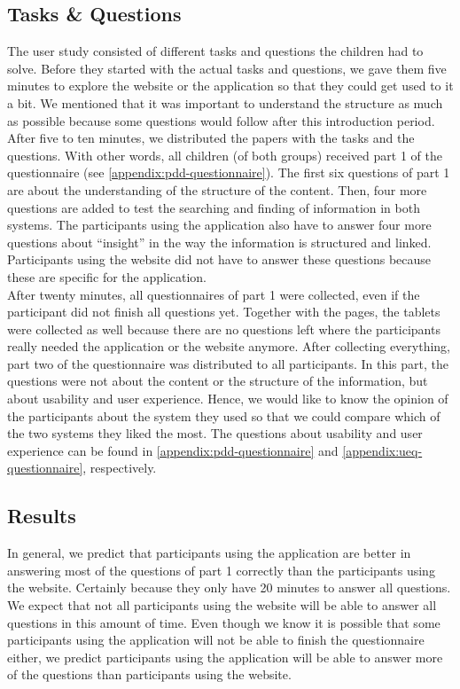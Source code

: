 \subsection{Tasks \& Questions}
The user study consisted of different tasks and questions the children had to solve. Before they started with the actual tasks and questions, we gave them five minutes to explore the website or the application so that they could get used to it a bit. We mentioned that it was important to understand the structure as much as possible because some questions would follow after this introduction period.\\

After five to ten minutes, we distributed the papers with the tasks and the questions. With other words, all children (of both groups) received part 1 of the questionnaire (see \autoref{appendix:pdd-questionnaire}). The first six questions of part 1 are about the understanding of the structure of the content. Then, four more questions are added to test the searching and finding of information in both systems. The participants using the application also have to answer four more questions about ``insight'' in the way the information is structured and linked. Participants using the website did not have to answer these questions because these are specific for the application.\\

After twenty minutes, all questionnaires of part 1 were collected, even if the participant did not finish all questions yet. Together with the pages, the tablets were collected as well because there are no questions left where the participants really needed the application or the website anymore. After collecting everything, part two of the questionnaire was distributed to all participants. In this part, the questions were not about the content or the structure of the information, but about usability and user experience. Hence, we would like to know the opinion of the participants about the system they used so that we could compare which of the two systems they liked the most. The questions about usability and user experience can be found in \autoref{appendix:pdd-questionnaire} and \autoref{appendix:ueq-questionnaire}, respectively.



\subsection{Results}
In general, we predict that participants using the application are better in answering most of the questions of part 1 correctly than the participants using the website. Certainly because they only have 20 minutes to answer all questions. We expect that not all participants using the website will be able to answer all questions in this amount of time. Even though we know it is possible that some participants using the application will not be able to finish the questionnaire either, we predict participants using the application will be able to answer more of the questions than participants using the website.\\

